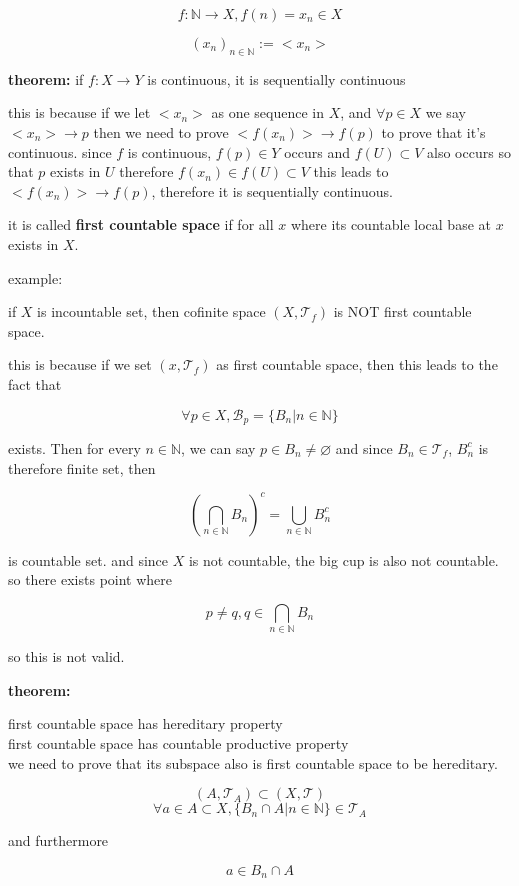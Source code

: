 \documentclass{article}
\begin{document}
\[
f:\mathbb{N} \rightarrow X, f(n)=x_n \in X
\]

\[
(x_n)_{n\in \mathbb{N}}:=<x_n>
\]


\textbf{ theorem:} if $f:X\rightarrow Y$ is continuous, it is sequentially continuous

this is because if we let $<x_n>$ as one sequence in $X$, and $\forall p\in X$ we say $<x_n>\rightarrow p$ then  we need to prove $<f(x_n)> \rightarrow f(p)$ to prove that it's continuous. since $f$ is continuous, $f(p)\in Y$ occurs and $f(U)\subset V$ also occurs so that $p$ exists in $U$ therefore $f(x_n)\in f(U)\subset V$ this leads to $<f(x_n)> \rightarrow f(p)$, therefore it is sequentially continuous.

it is called \textbf{ first countable space} if for all $x$ where its countable local base at $x$ exists in $X$.

example: 

if $X$ is incountable set, then cofinite space $(X,\mathcal{T}_f)$ is NOT first countable space.

this is because if we set $(x,\mathcal{T}_f)$ as first countable space, then this leads to the fact that

\[
\forall p\in X, \mathcal{B}_p=\{B_n|n\in \mathbb{N}\} 
\]

exists. Then for every $n\in \mathbb{N}$, we can say $p\in B_n\neq \varnothing$ and since $B_n\in \mathcal{T}_f$, $B_n^c$ is therefore finite set, then

\[
(\bigcap_{n\in \mathbb{N}}B_n)^{c}=\bigcup_{n\in\mathbb{N}}B_n^c
\]

is countable set. and since $X$ is not countable, the big cup is also not countable. so there exists point where

\[
p\neq q, q\in \bigcap_{n\in \mathbb{N}}B_n
\]

so this is not valid.

\textbf{theorem:}

first countable space has hereditary property\\
first countable space has countable productive property\\

we need to prove that its subspace also is first countable space to be hereditary.

\[
(A,\mathcal{T}_A)\subset (X,\mathcal{T})
\]
\[
\forall a\in A\subset X, \{B_n\cap A|n\in \mathbb{N}\}\in \mathcal{T}_A
\]

and furthermore

\[
a\in B_n\cap A
\]
\end{document}
